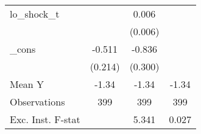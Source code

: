 {\begin{tabular}{l*{3}{c}}
\addlinespace
lo\_shock\_t  &                     &       0.006         &                     \\
            &                     &     (0.006)         &                     \\
\addlinespace
\_cons      &      -0.511\sym{**} &      -0.836\sym{**} &                     \\
            &     (0.214)         &     (0.300)         &                     \\
\midrule
Mean Y      &       -1.34         &       -1.34         &       -1.34         \\
Observations&         399         &         399         &         399         \\
Exc. Inst. F-stat&                     &       5.341         &       0.027         \\
\bottomrule
\end{tabular}
}

